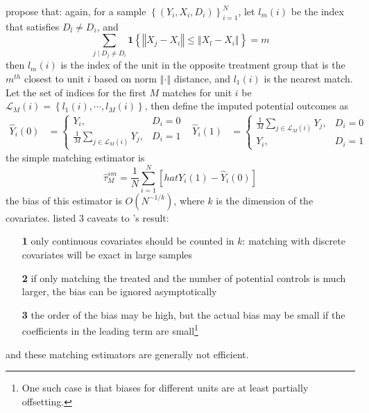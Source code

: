 \documentclass[twoside]{article}
\begin{document}
\citet{abadie2002simple} propose that: again, for a sample $\left\{ \left(Y_i,X_i,D_i\right) \right\}^N_{i=1}$, let $l_m(i)$ be the index that satisfies $D_l\neq D_i$, and 
    \begin{equation*}
        \sum_{j\mid D_j\neq D_i} \mathbf{1} \left\{ \left\Vert X_j-X_i \right\Vert \leq \left\Vert X_l-X_i \right\Vert \right\} = m
    \end{equation*}
    then $l_m(i)$ is the index of the unit in the opposite treatment group that is the $m^{th}$ closest to unit $i$ based on norm $\left\Vert \cdot \right\Vert$ distance, and $l_1(i)$ is the nearest match. Let the set of indices for the first $M$ matches for unit $i$ be $\mathcal{L}_M(i) = \left\{l_1(i),\cdots,l_M(i)\right\}$, then define the imputed potential outcomes as 
    \begin{align*}
        \hat{Y}_i(0) &= \begin{cases}
            Y_i, & D_i=0\\
            \frac{1}{M} \sum_{j\in\mathcal{L}_M(i)} Y_j, & D_i=1
        \end{cases}
        & \hat{Y}_i(1) &= \begin{cases}
            \frac{1}{M} \sum_{j\in\mathcal{L}_M(i)} Y_j, & D_i=0 \\
            Y_i, & D_i=1
        \end{cases}
    \end{align*}
    the simple matching estimator is 
    \begin{equation*}
        \hat{\tau}^{sm}_M = \frac{1}{N} \sum^N_{i=1} \left[hat{Y}_i(1) - \hat{Y}_i(0)\right]
    \end{equation*}
    the bias of this estimator is $O\left(N^{-1/k}\right)$, where $k$ is the dimension of the covariates. \citet{imbens2004nonparametric} listed 3 caveats to \cite{abadie2002simple}'s result:
    \begin{itemize}
        \item[\textbf{1}] only continuous covariates should be counted in $k$: matching with discrete covariates will be exact in large samples
        \item[\textbf{2}] if only matching the treated and the number of potential controls is much larger, the bias can be ignored asymptotically 
        \item[\textbf{3}] the order of the bias may be high, but the actual bias may be small if the coefficients in the leading term are small\footnote{One such case is that biases for different units are at least partially offsetting.}
    \end{itemize}
    and these matching estimators are generally not efficient.
\end{document}
